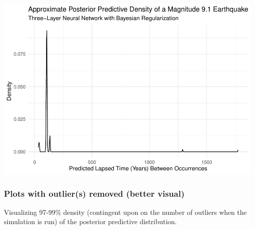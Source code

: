 \begin{Shaded}
\begin{Highlighting}[]

\NormalTok{, }\NormalTok{(} \SpecialCharTok{/}\SpecialCharTok{\^{}}\SpecialCharTok{+}
\NormalTok{() }\SpecialCharTok{+} 
    \NormalTok{(} \NormalTok{,}
          \NormalTok{,}
          \NormalTok{,}
          \NormalTok{) }\SpecialCharTok{+}
  \NormalTok{()}
\end{Highlighting}
\end{Shaded}


\includegraphics[width =.6\linewidth]
{earthquakes_files/figure-latex/unnamed-chunk-12-3.pdf}

\hypertarget{plots-with-outliers-removed-better-visual}{%
\subsubsection{Plots with outlier(s) removed (better
visual)}\label{plots-with-outliers-removed-better-visual}}

Visualizing 97-99\% density (contingent upon on the number of outliers
when the simulation is run) of the posterior predictive distribution.


